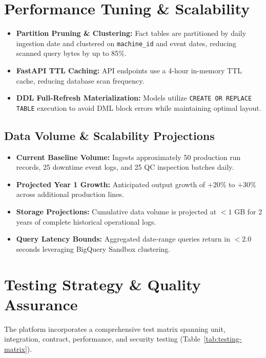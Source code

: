 \documentclass[12pt, a4paper]{report}
\begin{document}
\section{Performance Tuning \& Scalability}
\begin{itemize}
    \item \textbf{Partition Pruning \& Clustering:} Fact tables are partitioned by daily ingestion date and clustered on \texttt{machine\_id} and event dates, reducing scanned query bytes by up to 85\%.
    \item \textbf{FastAPI TTL Caching:} API endpoints use a 4-hour in-memory TTL cache, reducing database scan frequency.
    \item \textbf{DDL Full-Refresh Materialization:} Models utilize \texttt{CREATE OR REPLACE TABLE} execution to avoid DML block errors while maintaining optimal layout.
\end{itemize}

\subsection{Data Volume \& Scalability Projections}
\begin{itemize}
    \item \textbf{Current Baseline Volume:} Ingests approximately 50 production run records, 25 downtime event logs, and 25 QC inspection batches daily.
    \item \textbf{Projected Year 1 Growth:} Anticipated output growth of $+20\%$ to $+30\%$ across additional production lines.
    \item \textbf{Storage Projections:} Cumulative data volume is projected at $<1$ GB for 2 years of complete historical operational logs.
    \item \textbf{Query Latency Bounds:} Aggregated date-range queries return in $<2.0$ seconds leveraging BigQuery Sandbox clustering.
\end{itemize}

\section{Testing Strategy \& Quality Assurance}
The platform incorporates a comprehensive test matrix spanning unit, integration, contract, performance, and security testing (Table~\ref{tab:testing-matrix}).
\end{document}
